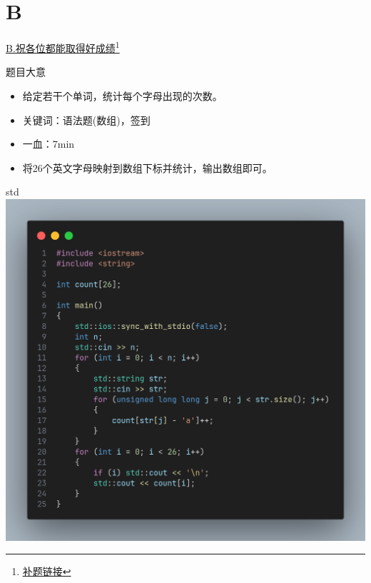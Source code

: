 \documentclass{beamer}
\begin{document}
    \section{B}
    \hypertarget{B}{}
    \begin{frame}{\hyperlink{toc}{B.祝各位都能取得好成绩}\footnote{\href{https://acm816.cn/p/237}{\underline{补题链接}}}}
        \begin{block}{题目大意}
            \begin{itemize}
                \item 给定若干个单词，统计每个字母出现的次数。
                \item 关键词：语法题(数组)，签到
                \item 一血：7min
            \end{itemize}
        \end{block}
        \begin{itemize}
            \item 将26个英文字母映射到数组下标并统计，输出数组即可。
        \end{itemize}
    \end{frame}
    \begin{frame}{std}
        \centering\includegraphics[scale=0.18]{images/std/B.png}
    \end{frame}
\end{document}
